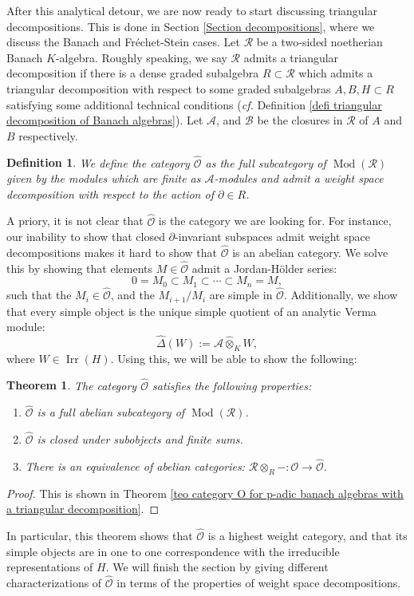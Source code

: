 \documentclass{amsart}
\newtheorem*{defi*}{ Definition}
\newtheorem{intteo}{Theorem}
\newcommand{\Mod}{\operatorname{Mod}}
\newcommand{\OX}{\mathcal{O}}
\begin{document}
After this analytical detour, we are now ready to start discussing triangular decompositions. This is done in Section \ref{Section decompositions}, where we discuss the Banach and Fréchet-Stein cases. Let $\mathscr{R}$ be a two-sided noetherian Banach $K$-algebra. Roughly speaking, we say $\mathscr{R}$ admits a triangular decomposition if there is a dense graded subalgebra $R\subset \mathscr{R}$ which admits a triangular decomposition with respect to some graded subalgebras $A,B,H\subset R$ satisfying some additional technical conditions (\emph{cf.} Definition \ref{defi triangular decomposition of Banach algebras}). Let $\mathscr{A}$, and $\mathscr{B}$ be the closures in $\mathscr{R}$ of $A$ and $B$ respectively.
\begin{defi*}
We define the category $\widehat{\OX}$ as the full subcategory of $\Mod(\mathscr{R})$ given by the modules which are finite as $\mathscr{A}$-modules and admit a weight space decomposition with respect to the action of $\partial\in R$.
\end{defi*}
A priory, it is not clear that $\widehat{\OX}$ is the category we are looking for. For instance, our inability to
show that closed $\partial$-invariant subspaces admit weight space decompositions makes it hard to show that $\widehat{\OX}$ is an abelian category. We solve this by showing that elements $M\in \widehat{\OX}$ admit a Jordan-Hölder series:
\begin{equation*}
    0=M_0\subset M_1\subset \cdots \subset M_n=M,
\end{equation*}
such that the $M_i\in \widehat{\OX}$, and the  $M_{i+1}/M_i$ are simple in $\widehat{\OX}$. Additionally, we  show that every simple object is the unique simple quotient of an analytic Verma module:
\begin{equation*}
    \widehat{\Delta}(W):= \mathscr{A}\widehat{\otimes}_KW,
\end{equation*}
where $W\in \operatorname{Irr}(H)$. Using this, we will be able to show the following:
\begin{intteo}
The category $\widehat{\OX}$ satisfies the following properties:
\begin{enumerate}[label=(\roman*)]
    \item $\widehat{\OX}$ is a full abelian subcategory of $\Mod(\mathscr{R})$.
    \item $\widehat{\OX}$ is closed under subobjects and finite sums.
    \item There is an equivalence of abelian categories: $\mathscr{R}\otimes_R-:\OX\rightarrow \widehat{\OX}.$
\end{enumerate}
\end{intteo}
\begin{proof}
This is shown in Theorem \ref{teo category O for p-adic banach algebras with a triangular decomposition}.
\end{proof}
In particular, this theorem shows that $\widehat{\OX}$ is a highest weight category, and that its simple objects are in one to one correspondence with the irreducible representations of $H$. We will finish the section by giving different characterizations of $\widehat{\OX}$ in terms of the properties of weight space decompositions.\bigskip
\end{document}
